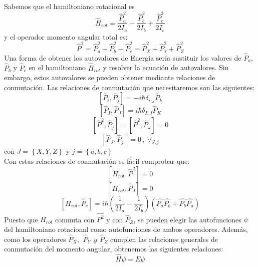 \documentclass[a4paper]{article}
\begin{document}
Sabemos que el hamiltoniano rotacional es
\begin{equation}
\hat H_{rot}=\frac{\hat P_a^2}{2I_a}+\frac{\hat P_b^2}{2I_b}+\frac{\hat P_c^2}{2I_c}
\end{equation}
y el operador momento angular total es:
\begin{equation}
\hat P^2 = \hat P_a^2+  \hat P_b^2+  \hat P_c^2 = \hat P_X^2+  \hat P_Y^2+  \hat P_Z^2
\end{equation}
Una forma de obtener los autovalores de Energía sería sustituir los valores de $\hat P_a$, $\hat P_b$ y $\hat P_c$ en el hamiltoniano $\hat H_{rot}$ y resolver la ecuación de autovalores. Sin embargo, estos autovalores se pueden obtener mediante relaciones de conmutación.
Las relaciones de conmutación que necesitaremos son las siguientes:
\begin{equation}
\left[\hat P_i,\hat P_j\right]=-i\hbar\delta_{i,j}\hat P_k
\end{equation}
\begin{equation}
\left[\hat P_I,\hat P_J\right]=i\hbar\delta_{I,J}\hat P_K
\end{equation}
\begin{equation}
\left[\hat P^2,\hat P_j\right]=\left[\hat P^2,\hat P_J\right]=0
\end{equation}
\begin{equation}
\left[\hat P_J,\hat P_j\right]=0 \,,\ \forall_{J,j}
\end{equation}
con $J = \left\lbrace X,Y,Z \right\rbrace$ y $j= \left\lbrace a,b,c \right\rbrace$ \\
Con estas relaciones de conmutación es fácil comprobar que:
\begin{equation}
\left[H_{rot}, \hat P^2 \right] = 0
\end{equation}
\begin{equation}
\left[H_{rot}, \hat P_J \right] = 0
\end{equation}
\begin{equation}
\left[H_{rot}, \hat P_c \right] = i\hbar \left(\frac{1}{2I_a}-\frac{1}{2I_b}\right)\left(\hat{P_a}\hat{P_b}+\hat{P_b}\hat{P_a}\right)
\end{equation}
Puesto que $H_{rot}$ conmuta con $\hat{P^2}$ y con $\hat P_Z$,  se pueden elegir las autofunciones $\psi$ del hamiltoniano rotacional como autofunciones de ambos operadores. Además, como los operadores $\hat P_X, \,\ \hat P_Y \,\ y \,\ \hat P_Z$ cumplen las relaciones generales de conmutación del momento angular, obtenemos las siguientes relaciones:
\begin{equation}
\hat H\psi = E\psi
\end{equation}
\end{document}
